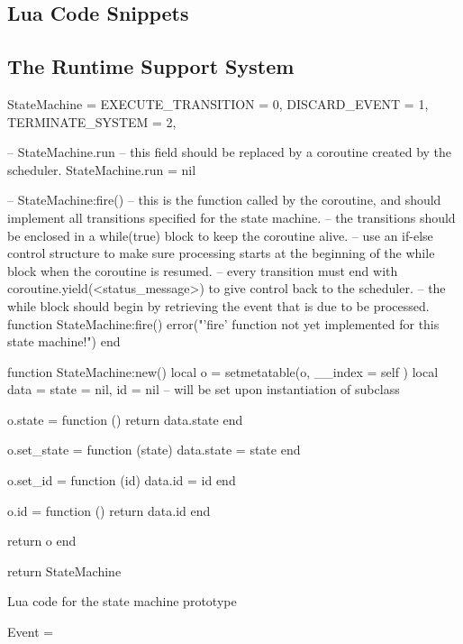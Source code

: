 \begin{appendices}

\chapter{Lua Code Snippets}
\label{app:code}

\section{The Runtime Support System}
\label{code:rts}

\begin{listing}[H]
\begin{luacode}
StateMachine = {
	EXECUTE_TRANSITION = 0,
	DISCARD_EVENT = 1,
	TERMINATE_SYSTEM = 2,
}

-- StateMachine.run
-- this field should be replaced by a coroutine created by the scheduler.
StateMachine.run = nil

-- StateMachine:fire()
-- this is the function called by the coroutine, and should implement all transitions specified for the state machine.
-- the transitions should be enclosed in a while(true) block to keep the coroutine alive.
-- use an if-else control structure to make sure processing starts at the beginning of the while block when the coroutine is resumed.
-- every transition must end with coroutine.yield(<status_message>) to give control back to the scheduler.
-- the while block should begin by retrieving the event that is due to be processed. 
function StateMachine:fire()
	error("'fire' function not yet implemented for this state machine!")
end

function StateMachine:new()
	local o = {}
	setmetatable(o, { __index = self })
	local data = {state = nil, id = nil} -- will be set upon instantiation of subclass
	
	o.state = function ()
		return data.state
	end
	
	o.set_state = function (state)
		data.state = state
	end
	
	o.set_id = function (id)
		data.id = id
	end
	
	o.id = function ()
		return data.id
	end
	
	return o
end

return StateMachine
\end{luacode}
	\caption{Lua code for the state machine prototype }
	\label{code:stm}
\end{listing}

\begin{listing}[H]
\begin{luacode}
Event = {}


\end{luacode}
\end{listing}
\end{appendices}
